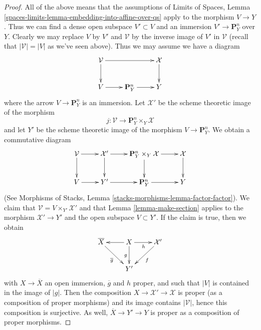 \documentclass[10pt,a4paper]{amsart}
\theoremstyle{plain}
\theoremstyle{definition}
\theoremstyle{remark}
\numberwithin{equation}{subsection}
\begin{document}
\begin{proof}
\medskip\noindent
All of the above means that the assumptions of
Limits of Spaces, Lemma \ref{spaces-limits-lemma-embedding-into-affine-over-qs}
apply to the morphism $V \to Y$. Thus we can find a dense open
subspace $V' \subset V$ and an immersion $V' \to \mathbf{P}^n_Y$
over $Y$. Clearly we may replace $V$ by $V'$ and $\mathcal{V}$
by the inverse image of $V'$ in $\mathcal{V}$ (recall that
$|\mathcal{V}| = |V|$ as we've seen above).
Thus we may assume we have a diagram
$$
\xymatrix{
\mathcal{V} \ar[rr] \ar[d] & & \mathcal{X} \ar[d] \\
V \ar[r] & \mathbf{P}^n_Y \ar[r] & Y
}
$$
where the arrow $V \to \mathbf{P}^n_Y$ is an immersion.
Let $\mathcal{X}'$ be the scheme theoretic image of the morphism
$$
j : \mathcal{V} \longrightarrow \mathbf{P}^n_Y \times_Y \mathcal{X}
$$
and let $Y'$ be the scheme theoretic image of the morphism
$V \to \mathbf{P}^n_Y$. We obtain a commutative diagram
$$
\xymatrix{
\mathcal{V} \ar[r] \ar[d] &
\mathcal{X}' \ar[r] \ar[d] &
\mathbf{P}^n_Y \times_Y \mathcal{X} \ar[d] \ar[r] &
\mathcal{X} \ar[d] \\
V \ar[r] &
Y' \ar[r] &
\mathbf{P}^n_Y \ar[r] &
Y
}
$$
(See Morphisms of Stacks, Lemma \ref{stacks-morphisms-lemma-factor-factor}).
We claim that $\mathcal{V} = V \times_{Y'} \mathcal{X}'$ and that
Lemma \ref{lemma-make-section} applies to the morphism $\mathcal{X}' \to Y'$
and the open subspace $V \subset Y'$. If the claim is true, then we obtain
$$
\xymatrix{
\overline{X} \ar[rd]_{\overline{g}} &
X \ar[l] \ar[d]_g \ar[r]_h & \mathcal{X}' \ar[ld]^f \\
& Y'
}
$$
with $X \to \overline{X}$ an open immersion, $\overline{g}$ and $h$ proper,
and such that $|V|$ is contained in the image of $|g|$.
Then the composition $X \to \mathcal{X}' \to \mathcal{X}$ is
proper (as a composition of proper morphisms) and its image
contains $|\mathcal{V}|$, hence this composition is surjective.
As well, $\overline{X} \to Y' \to Y$ is proper as a composition
of proper morphisms.


\end{proof}
\end{document}
